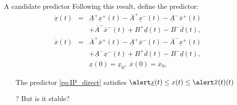 \documentclass[slideopt,A4,showboxes,svgnames]{beamer}
\begin{document}
\begin{frame}{A candidate predictor}
Following this result, define the predictor:
\begin{eqnarray}
\dot{\underline{x}}(t) & = & \underline{A}^{+}\underline{x}^{+}(t)-\overline{A}^{+}\underline{x}^{-}(t)-\underline{A}^{-}\overline{x}^{+}(t)\nonumber \\
&  & +\overline{A}^{-}\overline{x}^{-}(t)+B^{+}\underline{d}(t)-B^{-}\overline{d}(t),\label{eq:IP_direct}\\
\dot{\overline{x}}(t) & = & \overline{A}^{+}\overline{x}^{+}(t)-\underline{A}^{+}\overline{x}^{-}(t)-\overline{A}^{-}\underline{x}^{+}(t)\nonumber \\
&  & +\underline{A}^{-}\underline{x}^{-}(t)+B^{+}\overline{d}(t)-B^{-}\underline{d}(t),\nonumber \\
&  & \underline{x}(0)=\underline{x}_{0},\;\overline{x}(0)=\overline{x}_{0},\nonumber
\end{eqnarray}
\pause
\begin{proposition}
	\begin{itemize}
		\item[\checkmark] The predictor \eqref{eq:IP_direct} satisfies $\ux\leq x(t)\leq \ox(t)$
	\end{itemize} 
\end{proposition}
\pause
\begin{itemize}
	\item[?] But is it stable?
\end{itemize}
\end{frame}
\end{document}
